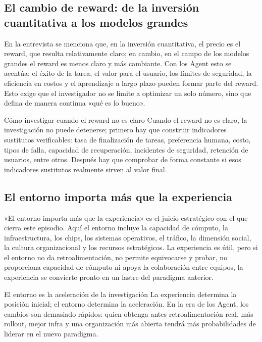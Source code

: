 \documentclass[a4paper]{article}
\begin{document}
\subsection{El cambio de reward: de la inversión cuantitativa a los modelos grandes}

En la entrevista se menciona que, en la inversión cuantitativa, el precio es el reward, que resulta relativamente claro; en cambio, en el campo de los modelos grandes el reward es menos claro y más cambiante. Con los Agent esto se acentúa: el éxito de la tarea, el valor para el usuario, los límites de seguridad, la eficiencia en costos y el aprendizaje a largo plazo pueden formar parte del reward. Esto exige que el investigador no se limite a optimizar un solo número, sino que defina de manera continua «qué es lo bueno».

\begin{knowledgebox}{Cómo investigar cuando el reward no es claro}
Cuando el reward no es claro, la investigación no puede detenerse; primero hay que construir indicadores sustitutos verificables: tasa de finalización de tareas, preferencia humana, costo, tipos de falla, capacidad de recuperación, incidentes de seguridad, retención de usuarios, entre otros. Después hay que comprobar de forma constante si esos indicadores sustitutos realmente sirven al valor final.
\end{knowledgebox}

\subsection{El entorno importa más que la experiencia}

«El entorno importa más que la experiencia» es el juicio estratégico con el que cierra este episodio. Aquí el entorno incluye la capacidad de cómputo, la infraestructura, los chips, los sistemas operativos, el tráfico, la dimensión social, la cultura organizacional y los recursos estratégicos. La experiencia es útil, pero si el entorno no da retroalimentación, no permite equivocarse y probar, no proporciona capacidad de cómputo ni apoya la colaboración entre equipos, la experiencia se convierte pronto en un lastre del paradigma anterior.

\begin{importantbox}{El entorno es la aceleración de la investigación}
La experiencia determina la posición inicial; el entorno determina la aceleración. En la era de los Agent, los cambios son demasiado rápidos: quien obtenga antes retroalimentación real, más rollout, mejor infra y una organización más abierta tendrá más probabilidades de liderar en el nuevo paradigma.
\end{importantbox}
\end{document}
